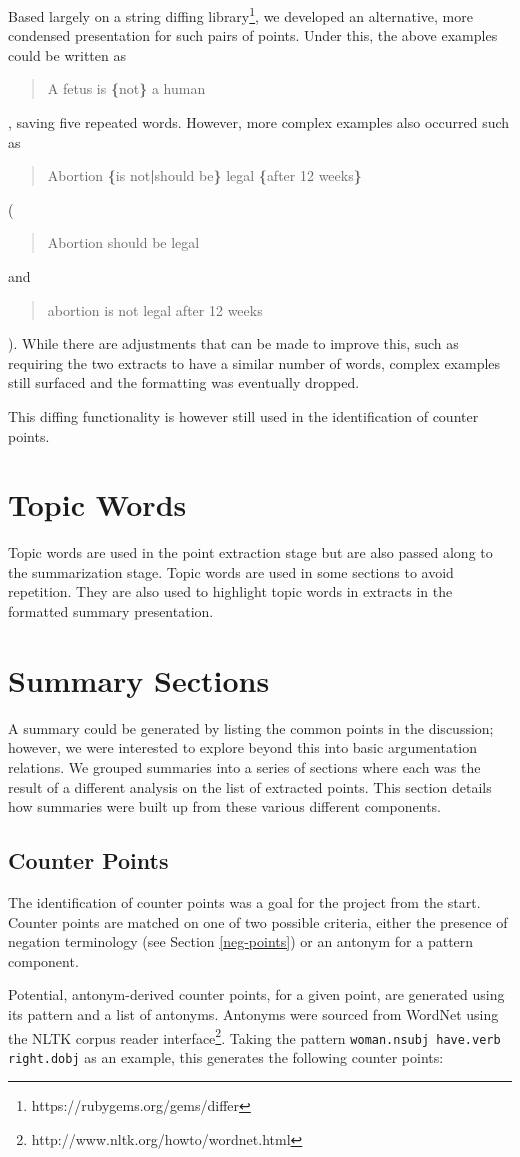       Based largely on a string diffing library\footnote{https://rubygems.org/gems/differ}, we developed an alternative, more condensed presentation for such pairs of points. Under this, the above examples could be written as \blockquote{A fetus is \textbf{\{}not\textbf{\}} a human}, saving five repeated words. However, more complex examples also occurred such as \blockquote{Abortion \textbf{\{}is not\textbf{|}should be\textbf{\}} legal \textbf{\{}after 12 weeks\textbf{\}}} (\blockquote{Abortion should be legal} and \blockquote{abortion is not legal after 12 weeks}). While there are adjustments that can be made to improve this, such as requiring the two extracts to have a similar number of words, complex examples still surfaced and the formatting was eventually dropped.

      This diffing functionality is however still used in the identification of counter points.

  \section{Topic Words}
    Topic words are used in the point extraction stage but are also passed along to the summarization stage. Topic words are used in some sections to avoid repetition. They are also used to highlight topic words in extracts in the formatted summary presentation.

  \section{Summary Sections}
    A summary could be generated by listing the common points in the discussion; however, we were interested to explore beyond this into basic argumentation relations. We grouped summaries into a series of sections where each was the result of a different analysis on the list of extracted points. This section details how summaries were built up from these various different components.

    \subsection{Counter Points}

    The identification of counter points was a goal for the project from the start. Counter points are matched on one of two possible criteria, either the presence of negation terminology (see Section \ref{neg-points}) or an antonym for a pattern component.

      Potential, antonym-derived counter points, for a given point, are generated using its pattern and a list of antonyms. Antonyms were sourced from WordNet \cite{miller1995wordnet} using the NLTK corpus reader interface\footnote{http://www.nltk.org/howto/wordnet.html}. Taking the pattern \texttt{woman.nsubj have.verb right.dobj} as an example, this generates the following counter points:

